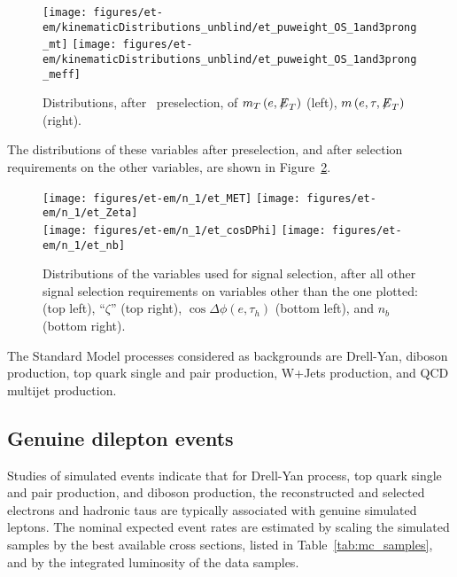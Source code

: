 \begin{figure}[thbp!]\centering
  \texttt{[image: figures/et-em/kinematicDistributions\_unblind/et\_puweight\_OS\_1and3prong\_mt]}
  \texttt{[image: figures/et-em/kinematicDistributions\_unblind/et\_puweight\_OS\_1and3prong\_meff]} \\
  \caption{\label{fig:et_preselection_distributions3} Distributions,
    after \teth ~preselection, of $m_{T}\left(e, {\not\mathrel{E}}_T\right)$
    (left), $m\left(e, \tau, {\not\mathrel{E}}_T\right)$ (right).}
\end{figure}

The distributions of these variables after preselection, and after
selection requirements on the other variables, are shown in
Figure~\ref{fig:et_nm1_distributions}.

\begin{figure}[thbp!]\centering
  \texttt{[image: figures/et-em/n\_1/et\_MET]}
  \texttt{[image: figures/et-em/n\_1/et\_Zeta]} \\
  \texttt{[image: figures/et-em/n\_1/et\_cosDPhi]}
  \texttt{[image: figures/et-em/n\_1/et\_nb]}
  \caption{\label{fig:et_nm1_distributions} Distributions of the
    variables used for \teth signal selection, after all other signal
    selection requirements on variables other than the one plotted:
    \ETslash (top left), ``$\zeta$'' (top right), $\cos{\Delta \phi
      (e,\tau_{h})}$ (bottom left), and $n_b$ (bottom right).}
\end{figure}

The Standard Model processes considered as backgrounds are Drell-Yan,
diboson production, top quark single and pair production, W+Jets
production, and QCD multijet production.

\subsection{Genuine dilepton events}

Studies of simulated events indicate that for Drell-Yan process, top
quark single and pair production, and diboson production, the
reconstructed and selected electrons and hadronic taus are typically
associated with genuine simulated leptons.  The nominal expected event
rates are estimated by scaling the simulated samples by the best
available cross sections, listed in Table~\ref{tab:mc_samples}, and by
the integrated luminosity of the data samples.

